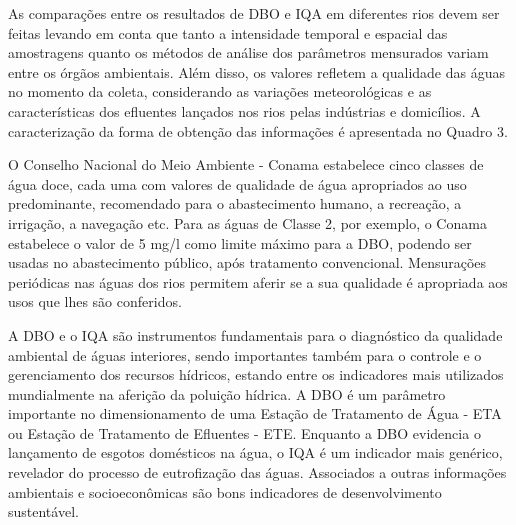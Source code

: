 As comparações entre os resultados de DBO e IQA em diferentes rios devem ser feitas levando em conta que tanto a intensidade temporal e espacial das amostragens quanto os métodos de análise dos parâmetros mensurados variam entre os órgãos ambientais. Além disso, os valores refletem a qualidade das águas no momento da coleta, considerando as variações meteorológicas e as características dos efluentes lançados nos rios pelas indústrias e domicílios. A caracterização da forma de obtenção das informações é apresentada no Quadro 3.


O Conselho Nacional do Meio Ambiente - Conama estabelece cinco classes de água doce, cada uma com valores
de qualidade de água apropriados ao uso predominante, recomendado
para o abastecimento humano, a recreação, a irrigação, a navegação etc. Para
as águas de Classe 2, por exemplo, o Conama estabelece o valor de 5 mg/l como
limite máximo para a DBO, podendo ser usadas no abastecimento público, após
tratamento convencional. Mensurações periódicas nas águas dos rios permitem
aferir se a sua qualidade é apropriada aos usos que lhes são conferidos.

A DBO e o IQA são instrumentos fundamentais para o diagnóstico da
qualidade ambiental de águas interiores, sendo importantes também para o
controle e o gerenciamento dos recursos hídricos, estando entre os indicadores
mais utilizados mundialmente na aferição da poluição hídrica. A DBO é um
parâmetro importante no dimensionamento de uma Estação de Tratamento de
Água - ETA ou Estação de Tratamento de Efluentes - ETE.
Enquanto a DBO evidencia o lançamento de esgotos domésticos na água,
o IQA é um indicador mais genérico, revelador do processo de eutrofização das
águas. Associados a outras informações ambientais e socioeconômicas são
bons indicadores de desenvolvimento sustentável.

